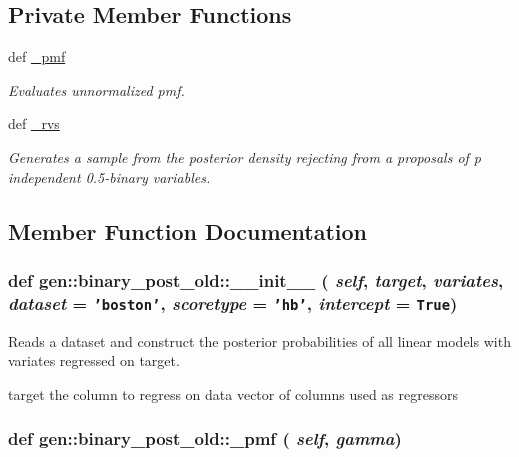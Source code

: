 \subsection*{Private Member Functions}
\begin{CompactItemize}
\item 
def \hyperlink{classgen_1_1binary__post__old_8c38416d6a1e4cc27cc2c63f86328fb7}{\_\-pmf}
\begin{CompactList}\small\item\em Evaluates unnormalized pmf. \item\end{CompactList}\item 
def \hyperlink{classgen_1_1binary__post__old_8a67ce87638a15897ced3053c461e881}{\_\-rvs}
\begin{CompactList}\small\item\em Generates a sample from the posterior density rejecting from a proposals of p independent 0.5-binary variables. \item\end{CompactList}\end{CompactItemize}


\subsection{Member Function Documentation}
\hypertarget{classgen_1_1binary__post__old_17a34493ef0f01b2fdc3fb1f0cdf7c27}{
\subsubsection[{\_\-\_\-init\_\-\_\-}]{\setlength{\rightskip}{0pt plus 5cm}def gen::binary\_\-post\_\-old::\_\-\_\-init\_\-\_\- ( {\em self}, \/   {\em target}, \/   {\em variates}, \/   {\em dataset} = {\tt 'boston'}, \/   {\em scoretype} = {\tt 'hb'}, \/   {\em intercept} = {\tt True})}}
\label{classgen_1_1binary__post__old_17a34493ef0f01b2fdc3fb1f0cdf7c27}


Reads a dataset and construct the posterior probabilities of all linear models with variates regressed on target. 

target the column to regress on data vector of columns used as regressors \hypertarget{classgen_1_1binary__post__old_8c38416d6a1e4cc27cc2c63f86328fb7}{
\subsubsection[{\_\-pmf}]{\setlength{\rightskip}{0pt plus 5cm}def gen::binary\_\-post\_\-old::\_\-pmf ( {\em self}, \/   {\em gamma})}}
\label{classgen_1_1binary__post__old_8c38416d6a1e4cc27cc2c63f86328fb7}


